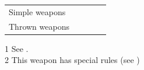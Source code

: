 \begin{longcolumn}
\begin{longtablewrapper}
\begin{longtable}{p{12em} l l l >{\lcol}p{24em}}
          Simple weapons                  &               &             &                             &                                                                         \\
          Thrown weapons                  &               &             &                             &                                                                         \\
        \end{longtable}
        1 See . \\
        2 This weapon has special rules (see ) \\
      \end{longtablewrapper}
    \end{longcolumn}

